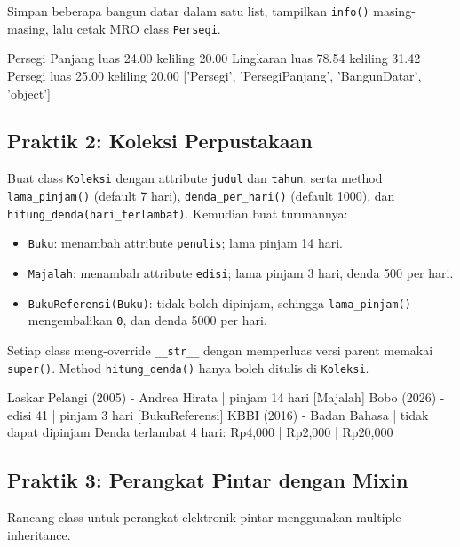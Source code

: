 Simpan beberapa bangun datar dalam satu list, tampilkan \texttt{info()} masing-masing, lalu cetak MRO class \texttt{Persegi}.

\begin{keluaran}
Persegi Panjang  luas   24.00  keliling  20.00
Lingkaran        luas   78.54  keliling  31.42
Persegi          luas   25.00  keliling  20.00
['Persegi', 'PersegiPanjang', 'BangunDatar', 'object']
\end{keluaran}

\subsection{Praktik 2: Koleksi Perpustakaan}

Buat class \texttt{Koleksi} dengan attribute \texttt{judul} dan \texttt{tahun}, serta method \texttt{lama\_pinjam()} (default 7 hari), \texttt{denda\_per\_hari()} (default 1000), dan \texttt{hitung\_denda(hari\_terlambat)}. Kemudian buat turunannya:

\begin{itemize}
  \item \texttt{Buku}: menambah attribute \texttt{penulis}; lama pinjam 14 hari.
  \item \texttt{Majalah}: menambah attribute \texttt{edisi}; lama pinjam 3 hari, denda 500 per hari.
  \item \texttt{BukuReferensi(Buku)}: tidak boleh dipinjam, sehingga \texttt{lama\_pinjam()} mengembalikan \texttt{0}, dan denda 5000 per hari.
\end{itemize}

Setiap class meng-override \texttt{\_\_str\_\_} dengan memperluas versi parent memakai \texttt{super()}. Method \texttt{hitung\_denda()} hanya boleh ditulis di \texttt{Koleksi}.

\begin{keluaran} Laskar Pelangi (2005) - Andrea Hirata | pinjam 14 hari
[Majalah] Bobo (2026) - edisi 41 | pinjam 3 hari
[BukuReferensi] KBBI (2016) - Badan Bahasa | tidak dapat dipinjam
Denda terlambat 4 hari: Rp4,000 | Rp2,000 | Rp20,000
\end{keluaran}

\subsection{Praktik 3: Perangkat Pintar dengan Mixin}

Rancang class untuk perangkat elektronik pintar menggunakan multiple inheritance.

